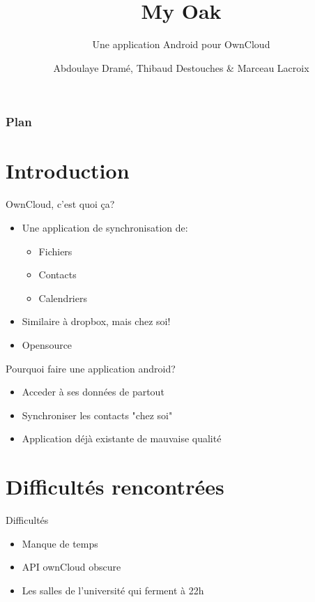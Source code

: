 \documentclass{beamer}
\title{My Oak}
\subtitle{Une application Android pour OwnCloud}
\author{Abdoulaye Dramé, Thibaud Destouches \& Marceau Lacroix}
\institute{ISTIC}
\date{}
\begin{document}
\begin{frame}
\titlepage
\end{frame}

\begin{frame}
\frametitle{Plan}
\tableofcontents
\end{frame}




\section{Introduction}

	\begin{frame}{OwnCloud, c'est quoi ça?}
	\begin{itemize}
	\item Une application de synchronisation de:
		\begin{itemize}
		\item Fichiers
		\item Contacts
		\item Calendriers
		\end{itemize}
	\item Similaire à dropbox, mais chez soi!
	\item Opensource
	\end{itemize}
	\end{frame}

	\begin{frame}{Pourquoi faire une application android?}
	\begin{itemize}
	\item Acceder à ses données de partout
	\pause
	\item Synchroniser les contacts "chez soi"
	\pause
	\item Application déjà existante de mauvaise qualité
	\end{itemize}
	\end{frame}






\section{Difficultés rencontrées}
\begin{frame}{Difficultés}
	\begin{itemize}
	\item Manque de temps
	\item API ownCloud obscure
	\item Les salles de l'université qui ferment à 22h
	\end{itemize}
	\end{frame}
\end{document}
